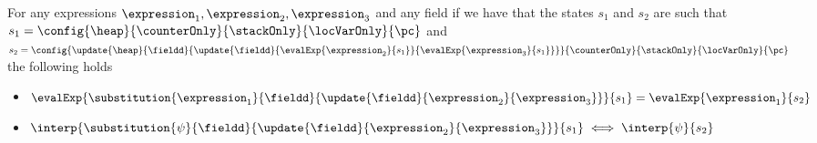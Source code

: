 \begin{substHeap}\label{substHeap}
For any expressions $ \expression_1, \expression_2, \expression_3 $ and any field \fieldd
if we have that the states $s_1$ and $s_2$ are such that
 $s_1 =   \config{\heap}{\counterOnly}{ \stackOnly }{\locVarOnly}{\pc }$ and 
  $s_2 =  \config{ \update{\heap}{\fieldd }{\update{\fieldd}
                                                   {\evalExp{\expression_2}{ s_1 } }
                                                   {\evalExp{ \expression_3}{ s_1 } } } }
                                          {\counterOnly}{ \stackOnly }{\locVarOnly}{\pc }   $  the following holds
\begin{itemize}
  \item $ \evalExp{\substitution{\expression_1}{\fieldd}{ \update{ \fieldd  }{\expression_2}{\expression_3} }}{ s_1 } =  \evalExp{\expression_1}{ s_2  }  $
  \item $ \interp{\substitution{\psi}{\fieldd}{ \update{ \fieldd  }{\expression_2}{\expression_3} }}{ s_1 } \iff  \interp{\psi}{ s_2  }  $
\end{itemize}
\end{substHeap}

